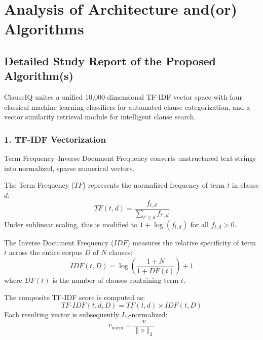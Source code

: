 \section{Analysis of Architecture and(or) Algorithms}
\label{sec:algorithms_analysis}

\subsection{Detailed Study Report of the Proposed Algorithm(s)}
\label{subsec:proposed_algorithms}
ClauseIQ unites a unified 10,000-dimensional TF-IDF vector space with four classical machine learning classifiers for automated clause categorization, and a vector similarity retrieval module for intelligent clause search.

\subsubsection*{1. TF-IDF Vectorization}
Term Frequency--Inverse Document Frequency converts unstructured text strings into normalized, sparse numerical vectors. 

The Term Frequency ($TF$) represents the normalized frequency of term $t$ in clause $d$:
\begin{equation}
    TF(t, d) = \frac{f_{t,d}}{\sum_{t' \in d} f_{t',d}}
\end{equation}
Under sublinear scaling, this is modified to $1 + \log(f_{t,d})$ for all $f_{t,d} > 0$.

The Inverse Document Frequency ($IDF$) measures the relative specificity of term $t$ across the entire corpus $D$ of $N$ clauses:
\begin{equation}
    IDF(t, D) = \log \left( \frac{1 + N}{1 + DF(t)} \right) + 1
\end{equation}
where $DF(t)$ is the number of clauses containing term $t$.

The composite TF-IDF score is computed as:
\begin{equation}
    TF\text{-}IDF(t, d, D) = TF(t, d) \times IDF(t, D)
\end{equation}
Each resulting vector is subsequently $L_2$-normalized:
\begin{equation}
    v_{\text{norm}} = \frac{v}{\|v\|_2}
\end{equation}

